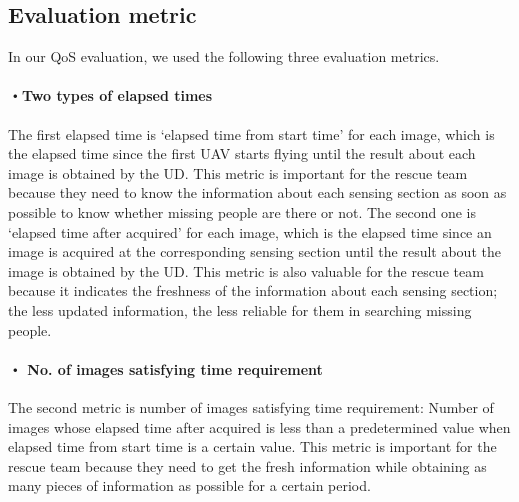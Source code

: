 \documentclass{ieeeaccess}
\begin{document}
\subsection{Evaluation metric}\label{compare}
In our QoS evaluation, we used the following three evaluation metrics.

\paragraph*{・Two types of elapsed times}
The first elapsed time is `elapsed time from start time' for each image, which is the elapsed time since the first UAV starts flying until the result about each image is obtained by the UD.
%
This metric is important for the rescue team because they need to know the information about each sensing section as soon as possible to know whether missing people are there or not.
%
The second one is `elapsed time after acquired' for each image, which is the elapsed time since an image is acquired at the corresponding sensing section until the result about the image is obtained by the UD.
%
This metric is also valuable for the rescue team because it indicates the freshness of the information about each sensing section; the less updated information, the less reliable for them in searching missing people.

\paragraph*{・ No. of images satisfying time requirement}
The second metric is number of images satisfying time requirement: Number of images whose elapsed time after acquired is less than a predetermined value when elapsed time from start time is a certain value.
This metric is important for the rescue team because they need to get the fresh information while obtaining as many pieces of information as possible for a certain period.
\end{document}
